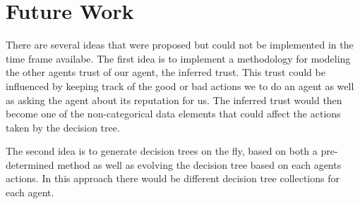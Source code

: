 \section{Future Work}
There are several ideas that were proposed but could not be implemented
in the time frame availabe.  The first idea is to implement a
methodology for modeling the other agents trust of our agent, the
inferred trust.  This trust could be influenced by keeping track of the
good or bad actions we to do an agent as well as asking the agent about
its reputation for us.  The inferred trust would then become one of the
non-categorical data elements that could affect the actions taken by
the decision tree.

The second idea is to generate decision trees on the fly, based on both a
pre-determined method as well as evolving the decision tree based on each
agents actions.  In this approach there would be different decision tree
collections for each agent.
